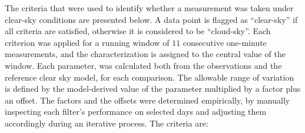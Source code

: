 \documentclass[
  preprint, 3p, authoryear]{article}
\begin{document}
The criteria that were used to identify whether a measurement was taken under clear-sky conditions are presented below.
A data point is flagged as ``clear-sky'' if all criteria are satisfied, otherwise it is considered to be ``cloud-sky''.
Each criterion was applied for a running window of \(11\) consecutive one-minute measurements, and the characterization is assigned to the central value of the window.
Each parameter, was calculated both from the observations and the reference clear sky model, for each comparison.
The allowable range of variation is defined by the model-derived value of the parameter multiplied by a factor plus an offset.
The factors and the offsets were determined empirically, by manually inspecting each filter's performance on selected days and adjusting them accordingly during an iterative process.
The criteria are:
\end{document}
